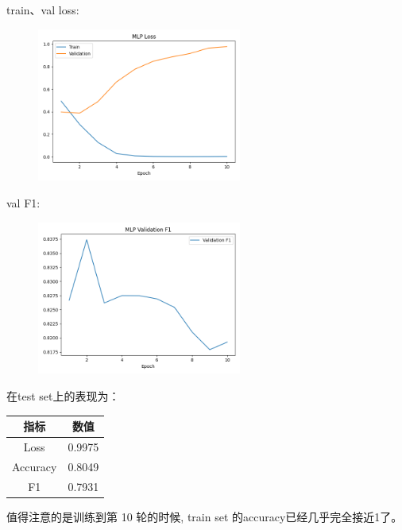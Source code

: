\documentclass{article}
\begin{document}
\FloatBarrier

train、val loss:
\begin{figure}[h]
    \centering
    \includegraphics[width=0.6\textwidth]{../results/mlp_loss.png}
\end{figure}

\FloatBarrier

val F1:
\begin{figure}[htbp]
    \centering
    \includegraphics[width=0.6\textwidth]{../results/mlp_f1.png}
\end{figure}

\FloatBarrier

在test set上的表现为：

\begin{table}[H]
    \centering
    \begin{tabular}{|c|c|}
        \hline 
        {\bf 指标} & {\bf 数值} \\
        \hline
        Loss & 0.9975 \\
        \hline 
        Accuracy & 0.8049 \\
        \hline
        F1 & 0.7931 \\
        \hline
    \end{tabular}
\end{table}

值得注意的是训练到第 10 轮的时候, train set 的accuracy已经几乎完全接近1了。
\end{document}
